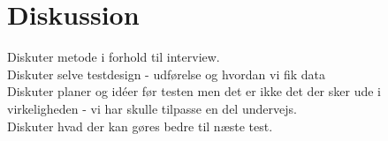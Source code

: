 \chapter{Diskussion}
\label{ParametreDiskussion}
%


Diskuter metode i forhold til interview. \\
Diskuter selve testdesign - udførelse og hvordan vi fik data\\
Diskuter planer og idéer før testen men det er ikke det der sker ude i virkeligheden - vi har skulle tilpasse en del undervejs. \\
Diskuter hvad der kan gøres bedre til næste test. \\